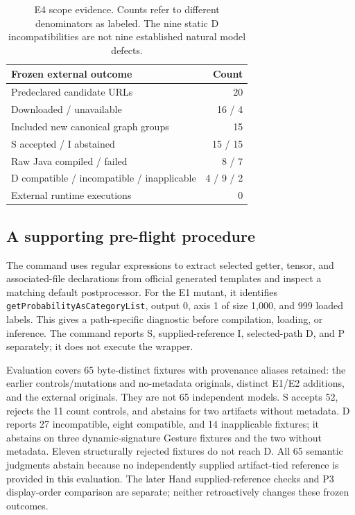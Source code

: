 \documentclass[10pt,twocolumn,letterpaper]{article}
\newcommand{\code}[1]{\texttt{#1}}
\begin{document}
\begin{table}[t]
\centering\small
\begin{tabular}{@{}lr@{}}
\toprule
Frozen external outcome & Count\\
\midrule
Predeclared candidate URLs & 20\\
Downloaded / unavailable & 16 / 4\\
Included new canonical graph groups & 15\\
S accepted / I abstained & 15 / 15\\
Raw Java compiled / failed & 8 / 7\\
D compatible / incompatible / inapplicable & 4 / 9 / 2\\
External runtime executions & 0\\
\bottomrule
\end{tabular}
\caption{E4 scope evidence. Counts refer to different denominators as labeled. The nine static D incompatibilities are not nine established natural model defects.}
\label{tab:external}
\end{table}

\subsection{A supporting pre-flight procedure}
The command uses regular expressions to extract selected getter, tensor, and associated-file declarations from official generated templates and inspect a matching default postprocessor. For the E1 mutant, it identifies \code{getProbabilityAsCategoryList}, output 0, axis 1 of size 1,000, and 999 loaded labels. This gives a path-specific diagnostic before compilation, loading, or inference. The command reports S, supplied-reference I, selected-path D, and P separately; it does not execute the wrapper.

Evaluation covers 65 byte-distinct fixtures with provenance aliases retained: the earlier controls/mutations and no-metadata originals, distinct E1/E2 additions, and the external originals. They are not 65 independent models. S accepts 52, rejects the 11 count controls, and abstains for two artifacts without metadata. D reports 27 incompatible, eight compatible, and 14 inapplicable fixtures; it abstains on three dynamic-signature Gesture fixtures and the two without metadata. Eleven structurally rejected fixtures do not reach D. All 65 semantic judgments abstain because no independently supplied artifact-tied reference is provided in this evaluation. The later Hand supplied-reference checks and P3 display-order comparison are separate; neither retroactively changes these frozen outcomes.
\end{document}
